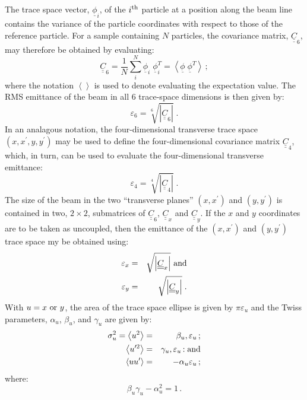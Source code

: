 The trace space vector, $\underline{\phi}_i$, of the $i^{\rm th}$
particle at a position along the beam line contains the variance of
the particle coordinates with respect to those of the reference
particle.
For a sample containing $N$ particles, the covariance matrix,
$\underline{\underline{C}}_6$, may therefore be obtained by evaluating:
\begin{equation}
  \underline{\underline{C}}_6 = \frac{1}{N} \sum_i^N
                                    \underline{\phi}_i \; \underline{\phi}_i^T
                              = \left<
                                    \underline{\phi} \; \underline{\phi}^T
                                \right> \, ;
  \label{Eq:Cov6}
\end{equation}
where the notation $\left< \right>$ is used to denote evaluating the
expectation value.
The RMS emittance of the beam in all 6 trace-space dimensions is then
given by:
\begin{equation}
  \varepsilon_6 = \sqrt[6]{\left| \underline{\underline{C}}_6 \right| }\;.
\end{equation}
In an analagous notation, the four-dimensional transverse trace space
$(x, x^\prime, y, y^\prime)$ may be used to define the
four-dimensional covariance matrix $\underline{\underline{C}}_4$,
which, in turn, can be used to evaluate the four-dimensional
transverse emittance:
\begin{equation}
  \varepsilon_4 = \sqrt[4]{\left| \underline{\underline{C}}_4 \right| }\;.
\end{equation}
The size of the beam in the two ``transverse planes'' $(x, x^\prime)$
and $(y, y^\prime)$ is contained in two, $2 \times 2$, submatrices of
$\underline{\underline{C}}_6$, $\underline{\underline{C}}_x$ and
$\underline{\underline{C}}_y$.
If the $x$ and $y$ coordinates are to be taken as uncoupled, then the
emittance of the $(x, x^\prime)$ and $(y, y^\prime)$ trace space my
be obtained using:
\begin{eqnarray}
  \varepsilon_x & = & \sqrt     {\left| \underline{\underline{C}}_x \right| }
    {\rm~and} \\
  \varepsilon_y & = & \sqrt{\left| \underline{\underline{C}}_y \right| }\;.
\end{eqnarray}
With $u=x~{\rm or}~y$, the area of the trace space ellipse is given
by $\pi \varepsilon_u$ and the Twiss parameters, $\alpha_u$,
$\beta_u$, and $\gamma_u$ are given by:
\begin{eqnarray}
  \sigma_u^2 = \left< u^2 \right> &         = & \beta_u, \varepsilon_u \, ;            \\
  \left< u^{\prime 2} \right> &              = & \gamma_u, \varepsilon_u \, {\rm : and} \\
  \left< u u^\prime \right>   &              = & -\alpha_u \varepsilon_u \, ;
\end{eqnarray}
where:
\begin{equation}
  \beta_u \gamma_u - \alpha_u^2 = 1 \, .
\end{equation}

